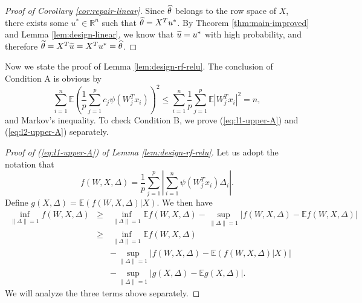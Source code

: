 \begin{proof}[Proof of Corollary \ref{cor:repair-linear}]
Since $\widehat{\theta}$ belongs to the row space of $X$, there exists some $u^*\in\mathbb{R}^n$ such that $\widehat{\theta}=X^Tu^*$.
By Theorem \ref{thm:main-improved} and Lemma \ref{lem:design-linear}, we know that $\widetilde{u}=u^*$ with high probability, and therefore $\widetilde{\theta}=X^T\widetilde{u}=X^Tu^*=\widehat{\theta}$.
\end{proof}


Now we state the proof of Lemma \ref{lem:design-rf-relu}. The conclusion of Condition A is obvious by
$$\sum_{i=1}^n\mathbb{E}\left(\frac{1}{p}\sum_{j=1}^pc_j\psi(W_j^Tx_i)\right)^2\leq \sum_{i=1}^n\frac{1}{p}\sum_{j=1}^p\mathbb{E}|W_j^Tx_i|^2= n,$$
and Markov's inequality. To check Condition B, we prove (\ref{eq:l1-upper-A}) and (\ref{eq:l2-upper-A}) separately.
\begin{proof}[Proof of (\ref{eq:l1-upper-A}) of Lemma \ref{lem:design-rf-relu}]
Let us adopt the notation that
$$f(W,X,\Delta)=\frac{1}{p}\sum_{j=1}^p\left|\sum_{i=1}^n\psi(W_j^Tx_i)\Delta_i\right|.$$
Define $g(X,\Delta)=\mathbb{E}(f(W,X,\Delta)|X)$.
We then have
\begin{eqnarray}
\nonumber \inf_{\|\Delta\|=1}f(W,X,\Delta) &\geq& \inf_{\|\Delta\|=1}\mathbb{E}f(W,X,\Delta) - \sup_{\|\Delta\|=1}\left|f(W,X,\Delta)-\mathbb{E}f(W,X,\Delta)\right| \\
\label{eq:exp-f-inf-relu} &\geq& \inf_{\|\Delta\|=1}\mathbb{E}f(W,X,\Delta) \\
\label{eq:ep-f-relu} && - \sup_{\|\Delta\|=1}\left|f(W,X,\Delta)-\mathbb{E}(f(W,X,\Delta)|X)\right| \\
\label{eq:ep-g-relu} && - \sup_{\|\Delta\|=1}\left|g(X,\Delta)-\mathbb{\mathbb{E}}g(X,\Delta)\right|.
\end{eqnarray}
We will analyze the three terms above separately.


\end{proof}
